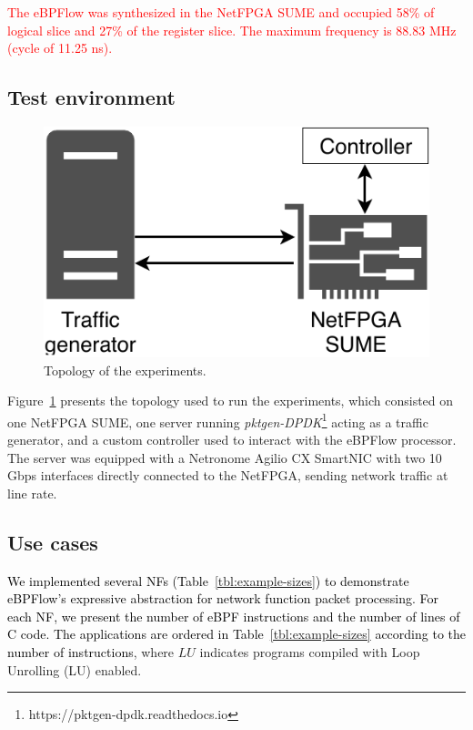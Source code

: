 
\textcolor{red}{The eBPFlow was synthesized in the NetFPGA SUME and occupied 58\% of logical slice and 27\% of the register slice. The maximum frequency is 88.83 MHz (cycle of 11.25 ns).}

\subsection{Test environment} 
\label{sec:experiments}

\begin{figure}[ht]
\centering
\includegraphics[width=0.7\columnwidth]{figures/test-topology-ebpflow.pdf}
\caption{Topology of the experiments.}
\label{fig:07_fig03}
\end{figure}

Figure~\ref{fig:07_fig03} presents the topology used to run the experiments, which consisted on one NetFPGA SUME, one server running \textit{pktgen-DPDK}\footnote{https://pktgen-dpdk.readthedocs.io} acting as a traffic generator, and a custom controller used to interact with the eBPFlow processor. The server was equipped with a Netronome Agilio CX SmartNIC with two 10 Gbps interfaces directly connected to the NetFPGA, sending network traffic at line rate.


\subsection{Use cases}
\textcolor{black}{We implemented several NFs (Table~\ref{tbl:example-sizes}) to demonstrate eBPFlow's expressive abstraction for network function packet processing. For each NF, we present the number of eBPF instructions and the number of lines of C code. The applications are ordered in Table~\ref{tbl:example-sizes} according to the number of instructions}, where $LU$ indicates programs compiled with Loop Unrolling (LU) enabled.

